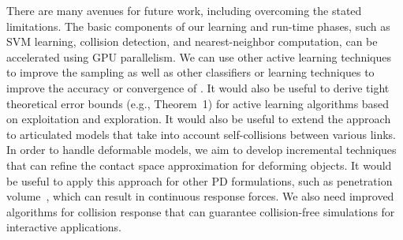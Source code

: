 There are many avenues for future work, including overcoming the stated limitations. The basic components of our learning and run-time phases, such as SVM learning, collision detection, and nearest-neighbor computation, can be accelerated using GPU parallelism. We can use other active learning techniques to improve the sampling as well as other classifiers or learning techniques to improve the accuracy or convergence of \LCS. It would also be useful to derive tight theoretical error bounds (e.g., Theorem~1) for active learning algorithms based on exploitation and exploration.
It would also be useful to extend the approach to articulated models that take into account self-collisions between various links.
In order to handle deformable models, we aim to develop incremental techniques that can refine the contact
space approximation for deforming objects. It would be useful to apply this approach for other PD formulations, such as penetration volume~\cite{Weller-RSS-09}, which can result in continuous response forces. We also need improved algorithms for collision response that can guarantee collision-free simulations for interactive applications.

